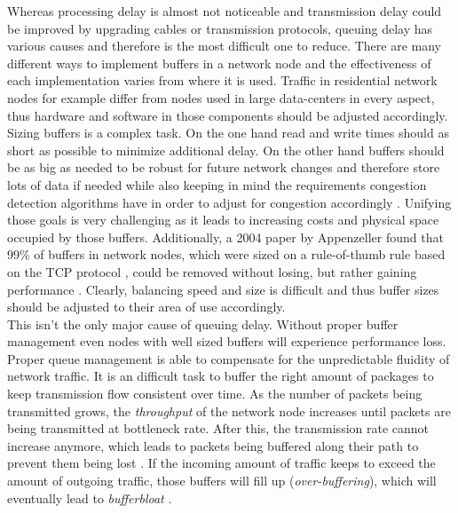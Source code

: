 \documentclass[a4paper,conference]{IEEEtran}
\begin{document}
Whereas processing delay is almost not noticeable and transmission delay could be improved by upgrading cables or transmission protocols, queuing delay has various causes and therefore is the  most difficult one to reduce. There are many different ways to implement buffers in a network node and the effectiveness of each implementation varies from where it is used. Traffic in residential network nodes for example differ from nodes used in large data-centers in every aspect, thus hardware and software in those components should be adjusted accordingly.
\\Sizing buffers is a complex task. On the one hand read and write times should as short as possible to minimize additional delay. On the other hand buffers should be as big as needed to be robust for future network changes and therefore store lots of data if needed while also keeping in mind the requirements congestion detection algorithms have in order to adjust for congestion accordingly \cite{staff2012bufferbloat}. Unifying those goals is very challenging as it leads to increasing costs and physical space occupied by those buffers. Additionally, a 2004 paper by Appenzeller found that 99\% of buffers in network nodes, which were sized on a rule-of-thumb rule based on the TCP protocol \cite{villamizar1994high}, could be removed without losing, but rather gaining performance \cite{appenzeller2004sizing}. Clearly, balancing speed and size is difficult and thus buffer sizes should be adjusted to their area of use accordingly.
\\This isn't the only major cause of queuing delay. Without proper buffer management even nodes with well sized buffers will experience performance loss. Proper queue management is able to compensate for the unpredictable fluidity of network traffic. It is an difficult task to buffer the right amount of packages to keep transmission flow consistent over time.
As the number of packets being transmitted grows, the \textit{throughput} of the network node increases until packets are being transmitted at bottleneck rate. After this, the transmission rate cannot increase anymore, which leads to packets being buffered along their path to prevent them being lost \cite{gettys2012bufferbloat}. If the incoming amount of traffic keeps to exceed the amount of outgoing traffic, those buffers will fill up (\textit{over-buffering}), which will eventually lead to \textit{bufferbloat} \cite{Allman13commentson,6886125}.
\end{document}
